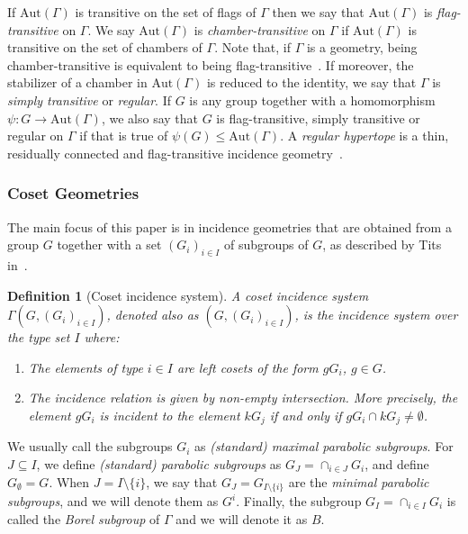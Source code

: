 \documentclass[11pt,letterpaper]{amsart}
\newtheorem{definition}[theorem]{Definition}
\newcommand{\Aut}{\mathrm{Aut}}
\begin{document}
If $\Aut(\Gamma)$ is transitive on the set of flags of $\Gamma$ then we say that $\Aut(\Gamma)$ is {\em flag-transitive} on $\Gamma$. We say $\Aut(\Gamma)$ is {\em chamber-transitive} on $\Gamma$ if $\Aut(\Gamma)$ is transitive on the set of chambers of $\Gamma$. Note that, if $\Gamma$ is a geometry, being chamber-transitive is equivalent to being flag-transitive~\cite[Proposition 2.2]{hypertopes}. If moreover, the stabilizer of a chamber in $\Aut(\Gamma)$ is reduced to the identity, we say that $\Gamma$ is {\em simply transitive} or {\em regular}. If $G$ is any group together with a homomorphism $\psi \colon G \to \Aut(\Gamma)$, we also say that $G$ is flag-transitive, simply transitive or regular on $\Gamma$ if that is true of $\psi(G) \leq \Aut(\Gamma)$.
A \textit{regular hypertope} is a thin, residually connected and flag-transitive incidence geometry~\cite{hypertopes}.


\subsubsection{Coset Geometries}\label{sec:CosetGeom}
The main focus of this paper is in incidence geometries that are obtained from a group $G$ together with a set $(G_i)_{i \in I}$ of subgroups of $G$, as described by Tits in~\cite{Tits1957}. 
\begin{definition}[Coset incidence system]
    A \emph{coset incidence system} $\Gamma(G,(G_i)_{i \in I})$, denoted also as $(G,(G_i)_{i \in I})$, is the incidence system over the type set $I$ where:
    \begin{enumerate}
        \item The elements of type $i \in I$ are left cosets of the form $g G_i $, $g \in G$.
        \item The incidence relation is given by non-empty intersection. More precisely, the element $g G_i$ is incident to the element $k G_j $ if and only if $g G_i \cap k G_j \neq \emptyset$.
    \end{enumerate}
\end{definition}
We usually call the subgroups $G_i$ as \emph{(standard) maximal parabolic subgroups}. For $J\subseteq I$, we define \emph{(standard) parabolic subgroups} as $G_J=\cap_{i\in J} G_i$, and define $G_\emptyset=G$.
When $J=I\setminus\{i\}$, we say that $G_J=G_{I\setminus\{i\}}$ are the \emph{minimal parabolic subgroups}, and we will denote them as $G^i$. Finally, the subgroup $G_I=\cap_{i\in I} G_i$ is called the \emph{Borel subgroup} of $\Gamma$ and we will denote it as $B$. 
    
\end{document}
